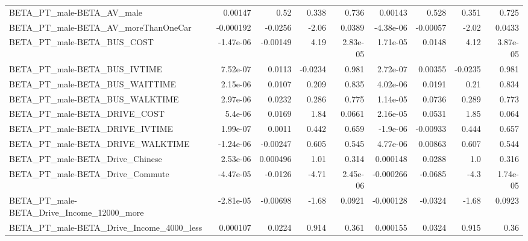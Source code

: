 \begin{tabular}{lrrrrrrrr}
BETA\_PT\_male-BETA\_AV\_male                          &     0.00147 &         0.52 &     0.338 &    0.736 &    0.00143 &       0.528 &        0.351 &         0.725 \\
BETA\_PT\_male-BETA\_AV\_moreThanOneCar                &   -0.000192 &      -0.0256 &     -2.06 &   0.0389 &  -4.38e-06 &    -0.00057 &        -2.02 &        0.0433 \\
BETA\_PT\_male-BETA\_BUS\_COST                         &   -1.47e-06 &     -0.00149 &      4.19 & 2.83e-05 &   1.71e-05 &      0.0148 &         4.12 &      3.87e-05 \\
BETA\_PT\_male-BETA\_BUS\_IVTIME                       &    7.52e-07 &       0.0113 &   -0.0234 &    0.981 &   2.72e-07 &     0.00355 &      -0.0235 &         0.981 \\
BETA\_PT\_male-BETA\_BUS\_WAITTIME                     &    2.15e-06 &       0.0107 &     0.209 &    0.835 &   4.02e-06 &      0.0191 &         0.21 &         0.834 \\
BETA\_PT\_male-BETA\_BUS\_WALKTIME                     &    2.97e-06 &       0.0232 &     0.286 &    0.775 &   1.14e-05 &      0.0736 &        0.289 &         0.773 \\
BETA\_PT\_male-BETA\_DRIVE\_COST                       &     5.4e-06 &       0.0169 &      1.84 &   0.0661 &   2.16e-05 &      0.0531 &         1.85 &         0.064 \\
BETA\_PT\_male-BETA\_DRIVE\_IVTIME                     &    1.99e-07 &       0.0011 &     0.442 &    0.659 &   -1.9e-06 &    -0.00933 &        0.444 &         0.657 \\
BETA\_PT\_male-BETA\_DRIVE\_WALKTIME                   &   -1.24e-06 &     -0.00247 &     0.605 &    0.545 &   4.77e-06 &     0.00863 &        0.607 &         0.544 \\
BETA\_PT\_male-BETA\_Drive\_Chinese                    &    2.53e-06 &     0.000496 &      1.01 &    0.314 &   0.000148 &      0.0288 &          1.0 &         0.316 \\
BETA\_PT\_male-BETA\_Drive\_Commute                    &   -4.47e-05 &      -0.0126 &     -4.71 & 2.45e-06 &  -0.000266 &     -0.0685 &         -4.3 &      1.74e-05 \\
BETA\_PT\_male-BETA\_Drive\_Income\_12000\_more          &   -2.81e-05 &     -0.00698 &     -1.68 &   0.0921 &  -0.000128 &     -0.0324 &        -1.68 &        0.0923 \\
BETA\_PT\_male-BETA\_Drive\_Income\_4000\_less           &    0.000107 &       0.0224 &     0.914 &    0.361 &   0.000155 &      0.0324 &        0.915 &          0.36 \\

\end{tabular}
